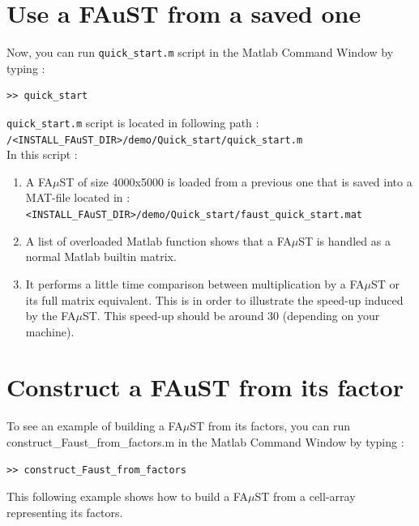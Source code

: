 \section{Use a FAuST from a saved one}\label{sec:firstUseBuildFromSave}
Now, you can run \texttt{quick\_start.m} script in the Matlab Command Window by typing :
\lstset{style=customMatlab}
\begin{lstlisting}
>> quick_start
\end{lstlisting}
\texttt{quick\_start.m} script is located in following path :\\
\texttt{/<INSTALL\_FAuST\_DIR>/demo/Quick\_start/quick\_start.m} \\
In this script :
\begin{enumerate} 
	\item A FA$\mu$ST of size 4000x5000 is loaded from a previous one that is saved into a MAT-file located in :\\
	\texttt{<INSTALL\_FAuST\_DIR>/demo/Quick\_start/faust\_quick\_start.mat}
	
	
	\item  A list of overloaded Matlab function shows that a FA$\mu$ST is handled as a normal Matlab builtin matrix.
 	

	\item It performs a little time comparison between multiplication by a FA$\mu$ST or its full matrix equivalent.
This is in order to illustrate the speed-up induced by the FA$\mu$ST. This speed-up should be around 30 (depending on your machine).
	
\end{enumerate}


\section{Construct a FAuST from its factor}\label{sec:firstUseBuildFactors}
To see an example of building a FA$\mu$ST from its factors, you can run construct\_Faust\_from\_factors.m in the Matlab Command Window by typing :
\lstset{style=customMatlab}
\begin{lstlisting}
>> construct_Faust_from_factors
\end{lstlisting}
This following example shows how to build a FA$\mu$ST from a cell-array representing its factors.



